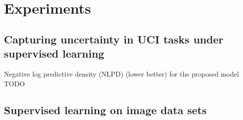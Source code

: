 \documentclass{article}
\newlength{\tblw}
\newcommand{\state}{\ensuremath{\mathbf{s}}}
\newcommand{\action}{\ensuremath{\mathbf{a}}}
\newcommand{\inducingVariable}{\ensuremath{\mathbf{u}}}
\newcommand{\dualParam}[1]{\ensuremath{\bm{\lambda}_{#1}}}
\newcommand{\meanParam}[1]{\ensuremath{\bm{\mu}_{#1}}}
\newcommand{\horizon}{\ensuremath{h}}
\newcommand{\latentFn}{\ensuremath{f}}
\begin{document}
%
%
%



\section{Experiments}
\label{sec:experiments}


\subsection{Capturing uncertainty in UCI tasks under supervised learning}
%


\begin{table}[t!] 
  \centering\scriptsize
  \caption{Negative log predictive density (NLPD) (lower better) for the proposed model TODO} 
	\label{tbl:uci}
	\renewcommand{\arraystretch}{1.}
	\setlength{\tabcolsep}{2pt}
	\setlength{\tblw}{0.14\textwidth}  
	
	\newcommand{\val}[2]{%
		$#1$\textcolor{gray}{\tiny ${\pm}#2$}
	} 

	
\end{table}




\subsection{Supervised learning on image data sets}
\end{document}

